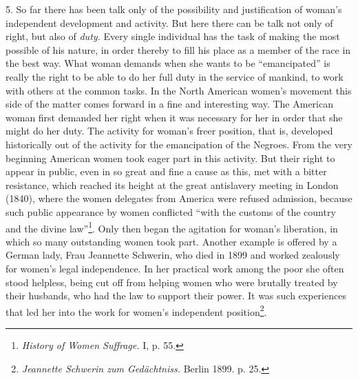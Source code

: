 \documentclass[12pt,a4paper,openany]{book}
\begin{document}
5. So far there has been talk only of the possibility and justification of woman's independent development and
activity. But here there can be talk not only of right, but also of \textit{duty.} Every single individual has the task
of making the most possible of his nature, in order thereby to fill his place as a member of the race in the best way.
What woman demands when she wants to be ``emancipated'' is really the right to be able to do her full duty in the
service of mankind, to work with others at the common tasks. In the North American women's movement this side of the
matter comes forward in a fine and interesting way. The American woman first demanded her right when it was necessary
for her in order that she might do her duty. The activity for woman's freer position, that is, developed historically
out of the activity for the emancipation of the Negroes. From the very beginning American women took eager part in this
activity. But their right to appear in public, even in so great and fine a cause as this, met with a bitter resistance,
which reached its height at the great antislavery meeting in London (1840), where the women delegates from America were
refused admission, because such public appearance by women conflicted ``with the customs of the country and the divine
law''\footnote[1]{\textit{History of Women Suffrage.} I, p. 55.}. %
Only then began the agitation for woman's liberation,
in which so many outstanding women took part. Another example is offered by a German lady, Frau Jeannette Schwerin, who
died in 1899 and worked zealously for women's legal independence. In her practical work among the poor she often stood
helpless, being cut off from helping women who were brutally treated by their husbands, who had the law to support their
power. It was such experiences that led her into the work for women's independent position\footnote[2]{\textit{Jeannette
Schwerin zum Gedächtniss.} Berlin 1899. p. 25.}.
\end{document}
